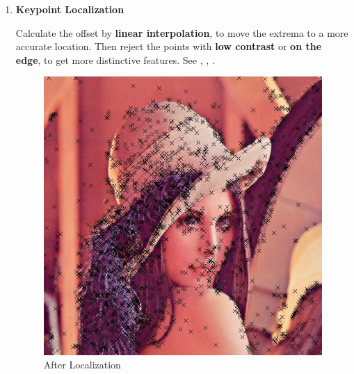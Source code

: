 \begin{enumerate}
  \item \textbf{Keypoint Localization}

    Calculate the offset by \textbf{linear interpolation},
    to move the extrema to a more accurate location.
    Then reject the points with \textbf{low contrast} or \textbf{on the edge}, to get more distinctive features.
    See , , .
    \begin{figure}[H]
      \begin{minipage}[b]{0.46\linewidth}
        \centering
        \includegraphics[scale=0.4]{res/feature_after_offset.png}
        \caption{After Localization \label{fig:feature1}}
      \end{minipage}
      \hspace{1em}
      \begin{minipage}[b]{0.46\linewidth}
        \centering

\end{minipage}
\end{figure}
\end{enumerate}
